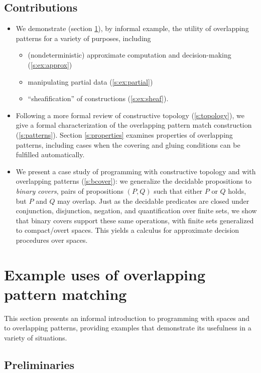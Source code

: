 \documentclass[conference]{IEEEtran}
\begin{document}
\subsection{Contributions}
\begin{itemize}
\item
We demonstrate (section \ref{s:examples}), by informal example, the utility of overlapping patterns for a variety of purposes, including
\begin{itemize}
\item (nondeterministic) approximate computation and decision-making (\ref{s:ex:approx})
\item manipulating partial data (\ref{s:ex:partial})
\item ``sheafification'' of constructions (\ref{s:ex:sheaf}).
\end{itemize}

\item Following a more formal review of constructive topology (\ref{s:topology}), we give a formal characterization of the overlapping pattern match construction (\ref{s:patterns}). Section \ref{s:properties} examines properties of overlapping patterns, including cases when the covering and gluing conditions can be fulfilled automatically. 

\item We present a case study of programming with constructive topology and with overlapping patterns (\ref{s:bcover}): we generalize the decidable propositions to \emph{binary covers}, pairs of propositions $(P, Q)$ such that either $P$ or $Q$ holds, but $P$ and $Q$ may overlap. Just as the decidable predicates are closed under conjunction, disjunction, negation, and quantification over finite sets, we show that binary covers support these same operations, with finite sets generalized to compact/overt spaces. This yields a calculus for approximate decision procedures over spaces.

\end{itemize}

\section{Example uses of overlapping pattern matching}
\label{s:examples}

This section presents an informal introduction to programming with spaces and to overlapping patterns, providing examples that demonstrate its usefulness in a variety of situations.

\subsection{Preliminaries}
\end{document}

